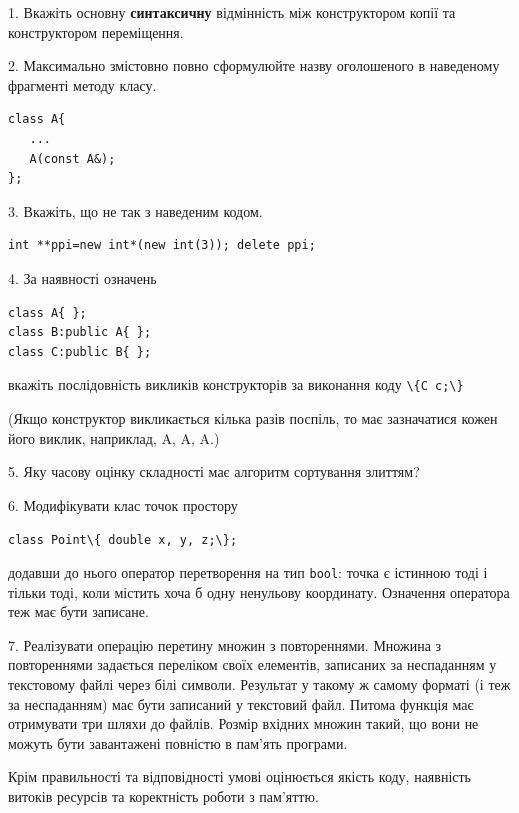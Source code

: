 \documentclass[12pt, ukrainian]{article}
\def\code#1{\Verb!#1!}
\begin{document}
{%
1. Вкажіть основну \textbf{синтаксичну} відмінність між конструктором копії та конструктором переміщення.%
\par
\vspace{2mm}
2. Максимально змістовно повно сформулюйте назву оголошеного в наведеному фрагменті методу класу.
\vspace{-3mm}
\begin{verbatim}class A{
   ...
   A(const A&);
};\end{verbatim}
\vspace{-3mm}
\par
\vspace{2mm}
3. Вкажіть, що не так з наведеним кодом.
\vspace{-3mm}
\begin{verbatim}int **ppi=new int*(new int(3)); delete ppi;\end{verbatim}
\vspace{-3mm}
\par
\vspace{2mm}
4. За наявності означень
\vspace{-3mm}
\begin{verbatim}
class A{ };
class B:public A{ };
class C:public B{ };\end{verbatim}
\vspace{-3mm}
вкажіть послідовність викликів конструкторів за виконання коду \code{\{C c;\}} 

(Якщо конструктор викликається кілька разів поспіль, то має зазначатися кожен його виклик, наприклад, A, A, A.)

\vspace{2mm}
5. Яку часову оцінку складності має алгоритм сортування злиттям?
\par
\vspace{2mm}
6. Модифікувати клас точок простору 

\qquad\code{class Point\{ double x, y, z;\};}


додавши до нього оператор перетворення на тип \code{bool}: точка є істинною тоді і тільки тоді, коли містить хоча б одну ненульову координату. Означення оператора теж має бути записане.%
\par
\vspace{2mm}
7. 
Реалізувати операцію перетину множин з повтореннями. Множина з повтореннями задається переліком своїх елементів, записаних за неспаданням у текстовому файлі через білі символи. Результат у такому ж самому форматі (і теж за неспаданням) має бути записаний у текстовий файл. Питома функція має отримувати три шляхи до файлів. Розмір вхідних множин такий, що вони не можуть бути завантажені повністю в пам’ять програми.

Крім правильності та відповідності умові оцінюється якість коду, наявність витоків ресурсів та коректність роботи з пам'яттю. 

}
\end{document}
